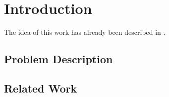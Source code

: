 \chapter{Introduction}
\label{cha:introduction}

The idea of this work has already been described in \cite{gabler2019graph}.

\section{Problem Description}
\label{sec:problem-description}


\section{Related Work}
\label{sec:related-work}


